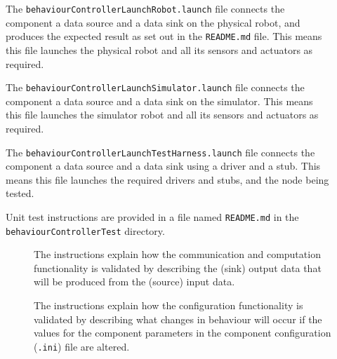 \documentclass{CSSRforAfrica}
\newcommand{\checkboxChecked}{\fbox{\ding{51}}} %
\newcommand{\checkboxDashed}{\fbox{--}}         %
\begin{document}
\begin{description}
\item[\checkboxDashed] The {\small \verb+behaviourControllerLaunchRobot.launch+} file  connects the component a data source and a data sink on the physical robot, and produces the expected result as set out in the  {\small \verb+README.md+}  file.    This means this file launches the physical robot and all its sensors and actuators as required.

\item[\checkboxDashed] The {\small \verb+behaviourControllerLaunchSimulator.launch+} file  connects the component a data source and a data sink on the simulator.   This means this file launches the simulator robot and all its sensors and actuators as required.

\item[\checkboxDashed] The {\small \verb+behaviourControllerLaunchTestHarness.launch+} file  connects the component a data source and a data sink using a driver and a stub.   This means this file launches the required drivers and stubs, and the node being tested.

\item[\checkboxChecked] Unit test instructions are provided in a file named {\small \verb+README.md+} in the  {\small \verb+behaviourControllerTest+} directory. 


\begin{description}

\item[\checkboxChecked] The instructions explain how the communication and computation functionality is validated by describing the (sink) output data that will be produced from the (source) input data.  

\item[\checkboxChecked] The instructions explain how the configuration functionality is validated by describing what changes in behaviour will occur if the values for the component parameters in the component configuration ({\small \verb+.ini+}) file are altered.

\end{description}

\end{description} 
  
%  
\end{document}
